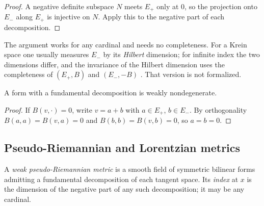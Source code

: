 \begin{proof}
  \leanok
  A negative definite subspace $N$ meets $E_+$ only at $0$, so the projection onto $E_-$ along
  $E_+$ is injective on $N$. Apply this to the negative part of each decomposition.
\end{proof}

\begin{remark}
  The argument works for any cardinal and needs no completeness. For a Krein space one usually
  measures $E_-$ by its \emph{Hilbert} dimension; for infinite index the two dimensions differ, and
  the invariance of the Hilbert dimension uses the completeness of $(E_+, B)$ and $(E_-, -B)$
  \cite{Bog74}. That version is not formalized.
\end{remark}

\begin{proposition}
  \label{prop:mt-nondegenerate}
  \leanok
  A form with a fundamental decomposition is weakly nondegenerate.
\end{proposition}

\begin{proof}
  \leanok
  If $B(v, \cdot) = 0$, write $v = a + b$ with $a \in E_+$, $b \in E_-$. By orthogonality
  $B(a,a) = B(v,a) = 0$ and $B(b,b) = B(v,b) = 0$, so $a = b = 0$.
\end{proof}

\subsection{Pseudo-Riemannian and Lorentzian metrics}

\begin{definition}
  \label{def:weak-pseudo-riemannian}
  \leanok
  A \emph{weak pseudo-Riemannian metric} is a smooth field of symmetric bilinear forms admitting a
  fundamental decomposition of each tangent space. Its \emph{index} at $x$ is the dimension of the
  negative part of any such decomposition; it may be any cardinal.
\end{definition}

